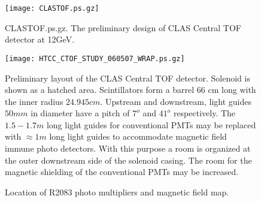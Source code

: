 
\begin{figure}[htbp]%
\begin{center}
\texttt{[image: CLASTOF.ps.gz]}
\end{center}
\caption{CLASTOF.ps.gz.
The preliminary design of  CLAS Central TOF detector  at 12GeV.
\label{barrel}}
\end{figure}
\clearpage


\begin{figure}[htbp]%
\begin{center}
\texttt{[image: HTCC\_CTOF\_STUDY\_060507\_WRAP.ps.gz]}
\end{center}
\caption{%
Preliminary layout of the   CLAS Central TOF detector. 
Solenoid is shown as a hatched area. Scintillators form a barrel  66 cm long 
with the inner radius $24.945cm$.
Upstream and downstream,   light guides 
$50mm$ in diameter have a pitch of $7^o$ and $41^o$ respectively. 
The $1.5-1.7m$ long light guides for conventional PMTs
 may be replaced with $\approx1m$ long  light guides to accommodate 
magnetic field immune photo detectors. With this purpose a room 
 is  organized  at the outer downstream side of the solenoid casing.
The room for the magnetic shielding of the conventional PMTs 
may  be increased.
\label{barrel2}}
\end{figure}
\clearpage

\begin{figure}[ht]
\vspace*{0.8cm}
\epsfverbosetrue\epsfxsize=15cm\epsfysize=15cm
\vspace*{0.8cm}
\caption{Location of R2083 photo multipliers and magnetic field map.
         \label{fig:mmap1}}
\end{figure}
\clearpage


